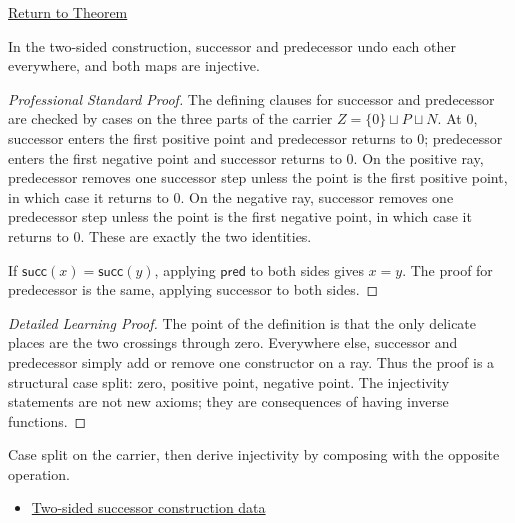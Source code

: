 \newpage
{}
\label{prf:two-sided-successor-predecessor-inverses}

\begin{remark*}[Return]
\hyperref[thm:two-sided-successor-predecessor-inverses]{Return to Theorem}
\end{remark*}

\begin{theorem*}
In the two-sided construction, successor and predecessor undo each other
everywhere, and both maps are injective.
\end{theorem*}

\begin{proof}[Professional Standard Proof]
\LRAProofBodyStart
The defining clauses for successor and predecessor are checked by cases on
the three parts of the carrier \(Z=\{0\}\sqcup P\sqcup N\). At \(0\), successor
enters the first positive point and predecessor returns to \(0\); predecessor
enters the first negative point and successor returns to \(0\). On the positive
ray, predecessor removes one successor step unless the point is the first
positive point, in which case it returns to \(0\). On the negative ray,
successor removes one predecessor step unless the point is the first negative
point, in which case it returns to \(0\). These are exactly the two identities.

If \(\mathsf{succ}(x)=\mathsf{succ}(y)\), applying
\(\mathsf{pred}\) to both sides gives \(x=y\). The proof for predecessor
is the same, applying successor to both sides.
\end{proof}

\begin{proof}[Detailed Learning Proof]
\LRAProofBodyStart
The point of the definition is that the only delicate places are the two
crossings through zero. Everywhere else, successor and predecessor simply add
or remove one constructor on a ray. Thus the proof is a structural case split:
zero, positive point, negative point. The injectivity statements are not new
axioms; they are consequences of having inverse functions.
\end{proof}

\begin{remark*}
Case split on the carrier, then derive injectivity by composing with the
opposite operation.
\end{remark*}

\begin{dependencies}
\begin{itemize}
  \item \hyperref[def:two-sided-successor-construction-data]{Two-sided successor construction data}
\end{itemize}
\end{dependencies}

\clearpage
